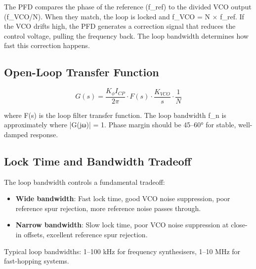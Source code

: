       

The PFD compares the phase of the reference (f\_ref) to the divided VCO output (f\_VCO/N). When they match, the loop is locked and f\_VCO = N × f\_ref. If the VCO drifts high, the PFD generates a correction signal that reduces the control voltage, pulling the frequency back. The loop bandwidth determines how fast this correction happens.


      

\subsection{Open-Loop Transfer Function}

      
\[G(s) = \dfrac{K_\phi I_{CP}}{2\pi}\cdot F(s)\cdot\dfrac{K_{VCO}}{s}\cdot\dfrac{1}{N}\]

      

where F(s) is the loop filter transfer function. The loop bandwidth f\_n is approximately where |G(jω)| = 1. Phase margin should be 45–60° for stable, well-damped response.

      

\subsection{Lock Time and Bandwidth Tradeoff}

      

The loop bandwidth controls a fundamental tradeoff:

      
\begin{itemize}

        \item \textbf{Wide bandwidth}: Fast lock time, good VCO noise suppression, poor reference spur rejection, more reference noise passes through.

        \item \textbf{Narrow bandwidth}: Slow lock time, poor VCO noise suppression at close-in offsets, excellent reference spur rejection.

      
\end{itemize}

      

Typical loop bandwidths: 1–100 kHz for frequency synthesisers, 1–10 MHz for fast-hopping systems.

      

